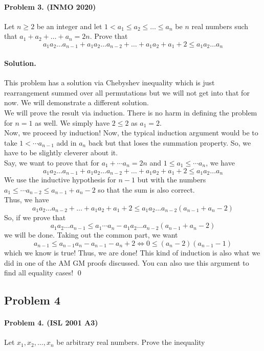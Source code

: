 \documentclass[12pt]{article}
\newenvironment{solution}
{\paragraph{Solution.}}
{\qed\eject}
\begin{document}
\paragraph{\textbf{Problem 3. (INMO 2020)}} Let $n \geqslant 2$ be an integer and let $1<a_1 \le a_2 \le \dots \le a_n$ be $n$ real numbers such that $a_1+a_2+\dots+a_n=2n$. Prove that \[a_1a_2\dots a_{n-1}+a_1a_2\dots a_{n-2}+\dots+a_1a_2+a_1+2 \leq a_1a_2\dots a_n\]

\begin{solution}
    This problem has a solution via Chebyshev inequality which is just rearrangement summed over all permutations but we will not get into that for now. We will demonstrate a different solution.\\

    We will prove the result via induction. There is no harm in defining the problem for $n=1$ as well. We simply have $2\le 2$ as $a_1=2$.\\

    Now, we proceed by induction! Now, the typical induction argument would be to take $1<\cdots a_{n-1}$ add in $a_n$ back but that loses the summation property. So, we have to be slightly cleverer about it.\\

    Say, we want to prove that for $a_1+\cdots a_n=2n$ and $1\le a_1\le \cdots a_n$, we have \[a_1a_2\dots a_{n-1}+a_1a_2\dots a_{n-2}+\dots+a_1a_2+a_1+2 \leq a_1a_2\dots a_n\]
    We use the inductive hypothesis for $n-1$ but with the numbers $a_1\le \cdots a_{n-2}\le a_{n-1}+a_{n}-2$ so that the sum is also correct.\\

    Thus, we have
    \[a_1a_2\dots a_{n-2}+\dots+a_1a_2+a_1+2 \leq a_1a_2\dots a_{n-2}(a_{n-1}+a_n-2)\]
    So, if we prove that \[a_1a_2\dots a_{n-1}\leq a_1\cdots a_n-a_1a_2\dots a_{n-2}(a_{n-1}+a_n-2)\]we will be done. Taking out the common part, we want \[a_{n-1}\le a_{n-1}a_n-a_{n-1}-a_n+2\iff 0\le (a_n-2)(a_{n-1}-1)\]
    which we know is true! Thus, we are done! This kind of induction is also what we did in one of the AM GM proofs discussed. You can also use this argument to find all equality cases!
\end{solution}

\subsection*{Problem 4}

\paragraph{\textbf{Problem 4. (ISL 2001 A3)}} Let $x_1,x_2,\ldots,x_n$ be arbitrary real numbers. Prove the inequality
\end{document}
